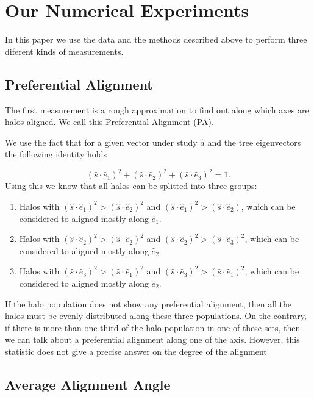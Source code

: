 \documentclass[useAMS,usenatbib]{mn2e}
\begin{document}
\section{Our Numerical Experiments}
In this paper we use the data and the methods described above to
perform three diferent kinds of measurements.


\subsection{Preferential Alignment}

The first measurement is a rough approximation to find out along which
axes are halos aligned. We call this Preferential Alignment (PA). 

We use the fact that for a given vector under study $\hat{a}$ and the
tree eigenvectors the following identity holds  
 
\begin{equation}
(\hat{s}\cdot\hat{e}_1)^2 +(\hat{s}\cdot\hat{e}_2)^2 +(\hat{s}\cdot\hat{e}_3)^2 =1.
\end{equation}
%
Using this we know that all halos can be splitted into three groups:

\begin{enumerate}
\item Halos with $(\hat{s}\cdot\hat{e}_1)^2> (\hat{s}\cdot\hat{e}_2)^2$
  and $(\hat{s}\cdot\hat{e}_1)^2> (\hat{s}\cdot\hat{e}_2)$, which can
  be considered to aligned mostly along $\hat{e}_1$.
\item Halos with $(\hat{s}\cdot\hat{e}_2)^2> (\hat{s}\cdot\hat{e}_2)^2$
  and $(\hat{s}\cdot\hat{e}_2)^2> (\hat{s}\cdot\hat{e}_3)^2$, which can
  be considered to aligned mostly along $\hat{e}_2$.
\item Halos with $(\hat{s}\cdot\hat{e}_3)^2> (\hat{s}\cdot\hat{e}_1)^2$
  and $(\hat{s}\cdot\hat{e}_3)^2> (\hat{s}\cdot\hat{e}_1)^2$, which can
  be considered to aligned mostly along $\hat{e}_2$.
\end{enumerate}

If the halo population does not show any preferential alignment, then
all the halos must be evenly distributed along these three
populations. On the contrary, if there is more than one third of the
halo population in one of these sets, then we can talk about a
preferential alignment along one of the axis. However, this statistic 
does not give a precise answer on the degree of the alignment


\subsection{Average Alignment Angle}
\end{document}
